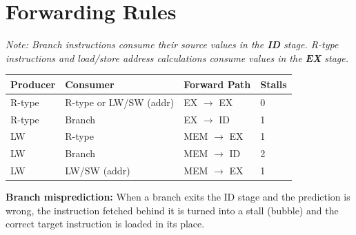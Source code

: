 \documentclass[9pt]{article}
\begin{document}
\section{Forwarding Rules}

\textit{Note: Branch instructions consume their source values in the \textbf{ID} stage. R-type instructions and load/store address calculations consume values in the \textbf{EX} stage.}

\vspace{4pt}
\begin{tabular}{@{}llll@{}}
  \toprule
  \textbf{Producer} & \textbf{Consumer} & \textbf{Forward Path} & \textbf{Stalls} \\
  \midrule
  R-type & R-type or LW/SW (addr) & EX $\to$ EX & 0 \\
  R-type & Branch                 & EX $\to$ ID & 1 \\
  \addlinespace
  LW     & R-type                 & MEM $\to$ EX & 1 \\
  LW     & Branch                 & MEM $\to$ ID & 2 \\
  LW     & LW/SW (addr)           & MEM $\to$ EX & 1 \\
  \bottomrule
\end{tabular}

\vspace{6pt}
\textbf{Branch misprediction:} When a branch exits the ID stage and the prediction is wrong, the instruction fetched behind it is turned into a stall (bubble) and the correct target instruction is loaded in its place.
\end{document}
